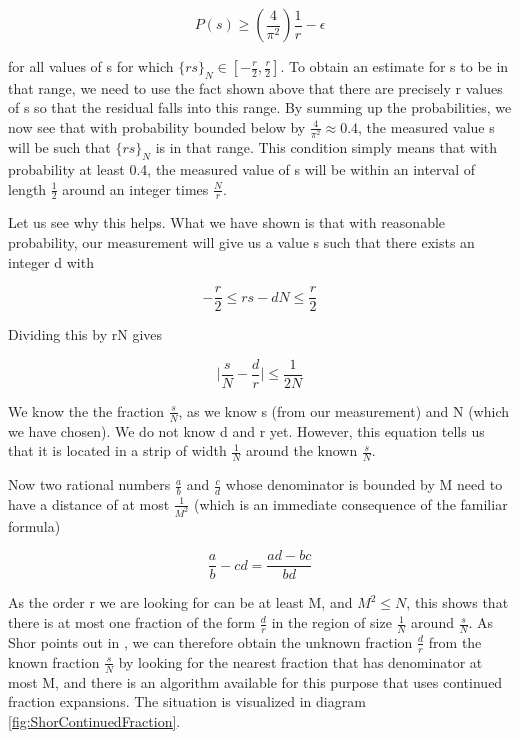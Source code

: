 \documentclass[a4paper, draft]{article}
\theoremstyle{own}
\theoremstyle{remark}
\begin{document}
$$
P(s) \geq (\frac{4}{\pi^2}) \frac{1}{r} - \epsilon 
$$

for all values of s for which $\{rs\}_N \in [-\frac{r}{2}, \frac{r}{2}]$. To obtain an estimate for s to be in that range, we need to use the fact shown above that there are precisely r values of s so that the residual falls into this range. By summing up the probabilities, we now see that with probability bounded below by $\frac{4}{\pi^2} \approx 0.4$, the measured value s will be such that $\{rs\}_N$ is in that range. This condition simply means that with probability at least 0.4, the measured value of s will be within an interval of length $\frac{1}{2}$ around an integer times $\frac{N}{r}$. 

Let us see why this helps. What we have shown is that with reasonable probability, our measurement will give us a value s such that there exists an integer d with 

$$
-\frac{r}{2} \leq rs - dN \leq \frac{r}{2}
$$

Dividing this by rN gives

$$
\big|  \frac{s}{N} - \frac{d}{r} \big| \leq \frac{1}{2N} 
$$

We know the the fraction $\frac{s}{N}$, as we know s (from our measurement) and N (which we have chosen). We do not know d and r yet. However, this equation tells us that it is located in a strip of width $\frac{1}{N}$ around the known $\frac{s}{N}$. 

Now two rational numbers $\frac{a}{b}$ and $\frac{c}{d}$ whose denominator is bounded by M need to have a distance of at most $\frac{1}{M^2}$ (which is an immediate consequence of the familiar formula)

$$
\frac{a}{b} - {c}{d} = \frac{ad - bc}{bd}
$$
 
As the order r we are looking for can be at least M, and $M^2 \leq N$, this shows that there is at most one fraction of the form $\frac{d}{r}$ in the region of size $\frac{1}{N}$ around $\frac{s}{N}$. As Shor points out in \cite{Shor96}, we can therefore obtain the unknown fraction $\frac{d}{r}$ from the known fraction $\frac{s}{N}$ by looking for the nearest fraction that has denominator at most M, and there is an algorithm available for this purpose that uses continued fraction expansions. The situation is visualized in diagram \ref{fig:ShorContinuedFraction}.
\end{document}
